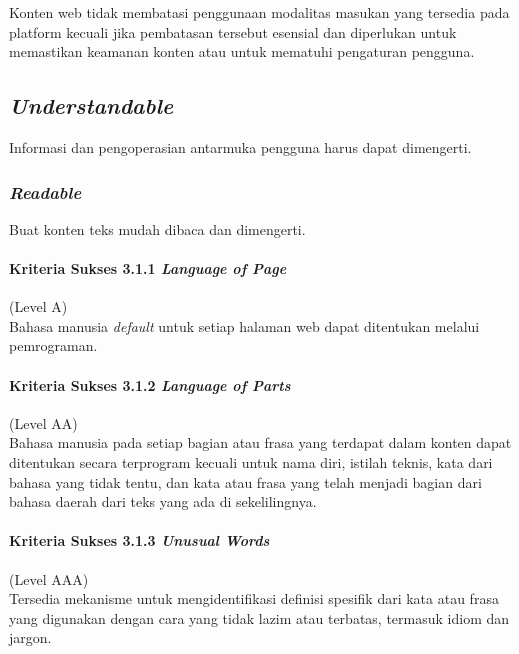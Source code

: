 Konten web tidak membatasi penggunaan modalitas masukan yang tersedia pada platform kecuali jika pembatasan tersebut esensial dan diperlukan untuk memastikan keamanan konten atau untuk mematuhi pengaturan pengguna.


\subsection{\textit{Understandable}}
\label{sec:understandable}
Informasi dan pengoperasian antarmuka pengguna harus dapat dimengerti.

\subsubsection{\textit{Readable}}
\label{sec:readable}
Buat konten teks mudah dibaca dan dimengerti.

\paragraph{Kriteria Sukses 3.1.1 \textit{Language of Page}}
\label{sec:kriteria_sukses_3.1.1}
(Level A)\\

Bahasa manusia \textit{default} untuk setiap halaman web dapat ditentukan melalui pemrograman.

\paragraph{Kriteria Sukses 3.1.2 \textit{Language of Parts}}
\label{sec:kriteria_sukses_3.1.2}
(Level AA)\\

Bahasa manusia pada setiap bagian atau frasa yang terdapat dalam konten dapat ditentukan secara terprogram kecuali untuk nama diri, istilah teknis, kata dari bahasa yang tidak tentu, dan kata atau frasa yang telah menjadi bagian dari bahasa daerah dari teks yang ada di sekelilingnya.

\paragraph{Kriteria Sukses 3.1.3 \textit{Unusual Words}}
\label{sec:kriteria_sukses_3.1.3}
(Level AAA)\\

Tersedia mekanisme untuk mengidentifikasi definisi spesifik dari kata atau frasa yang digunakan dengan cara yang tidak lazim atau terbatas, termasuk idiom dan jargon.

